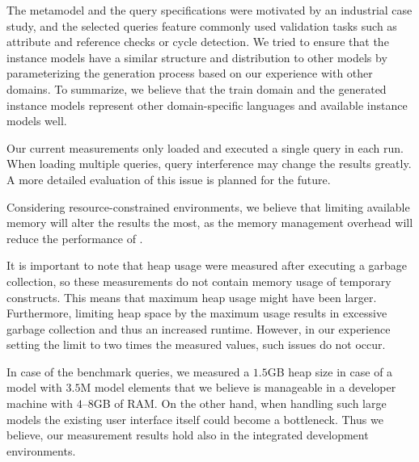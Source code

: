 The metamodel and the query specifications were motivated by an industrial case
study, and the selected queries feature commonly used validation tasks such as
attribute and reference checks or cycle detection. We tried to ensure that the
instance models have a similar structure and distribution to other models by
parameterizing the generation process based on our experience with other
domains. To summarize, we believe that the train domain and the generated
instance models represent other domain-specific languages and available instance
models well.

Our current measurements only loaded and executed a single query in each run.
When loading multiple queries, query interference may change the results
greatly. A more detailed evaluation of this issue is planned for the future.

Considering resource-constrained environments, we believe that limiting
available memory will alter the results the most, as the memory management
overhead will reduce the performance of \incquery{}.

It is important to note that heap usage were measured after executing a garbage
collection, so these measurements do not contain memory usage of temporary
constructs. This means that maximum heap usage might have been larger. Furthermore,
limiting heap space by the maximum usage results in excessive garbage collection
and thus an increased runtime. However, in our experience setting the limit to
two times the measured values, such issues do not occur.

In case of the benchmark queries, we measured a $1.5$GB heap size in case of a
model with $3.5$M model elements that we believe is manageable in a developer
machine with $4$--$8$GB of RAM. On the other hand, when handling such large
models the existing user interface itself could become a bottleneck. Thus we
believe, our measurement results hold also in the integrated development
environments.
